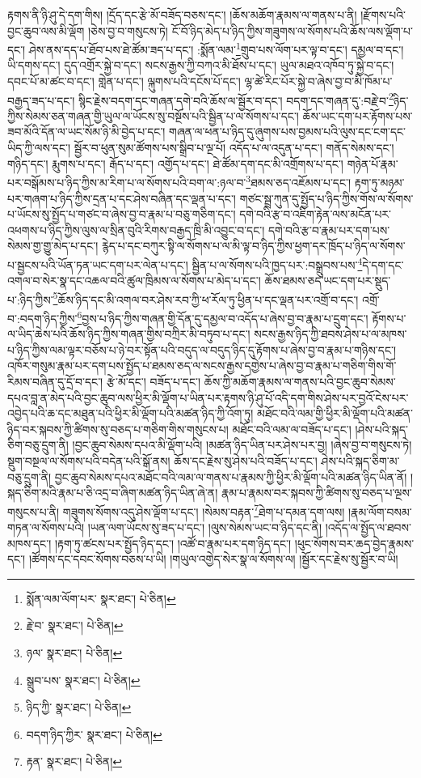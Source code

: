 རྟགས་ནི་ཉི་ཤུ་དེ་དག་གིས། །དྲོད་དང་རྩེ་མོ་བཟོད་བཅས་དང་། །ཆོས་མཆོག་རྣམས་ལ་གནས་པ་ནི། །རྫོགས་པའི་བྱང་ཆུབ་ལས་མི་ལྡོག །ཅེས་བྱ་བ་གསུངས་ཏེ། ངོ་བོ་ཉིད་མེད་པ་ཉིད་ཀྱིས་གཟུགས་ལ་སོགས་པའི་ཆོས་ལས་ལྡོག་པ་དང་། ཤེས་ནས་དད་པ་ཐོབ་པས་ཐེ་ཚོམ་ཟད་པ་དང་། :སྨོན་ལམ་\footnote{སྨོན་ལམ་ལོག་པར་  སྣར་ཐང་།  པེ་ཅིན། }གྲུབ་པས་ལོག་པར་ལྟ་བ་དང་། དམྱལ་བ་དང་། ཡི་དགས་དང་། དུད་འགྲོར་སྐྱེ་བ་དང་། སངས་རྒྱས་ཀྱི་བཀའ་མི་ཐོས་པ་དང་། ཡུལ་མཐའ་འཁོབ་ཏུ་སྐྱེ་བ་དང་། དབང་པོ་མ་ཚང་བ་དང་། གླེན་པ་དང་། ལྐུགས་པའི་དངོས་པོ་དང་། ལྷ་ཚེ་རིང་པོར་སྐྱེ་བ་ཞེས་བྱ་བ་མི་ཁོམ་པ་བརྒྱད་ཟད་པ་དང་། སྙིང་རྗེས་བདག་དང་གཞན་དགེ་བའི་ཆོས་ལ་སྦྱོར་བ་དང་། བདག་དང་གཞན་དུ་:བརྗེ་བ་\footnote{རྗེ་བ་  སྣར་ཐང་།  པེ་ཅིན། }ཉིད་ཀྱིས་སེམས་ཅན་གཞན་གྱི་ཡུལ་ལ་ཡོངས་སུ་བསྔོས་པའི་སྦྱིན་པ་ལ་སོགས་པ་དང་། ཆོས་ཡང་དག་པར་རྟོགས་པས་ཟབ་མོའི་དོན་ལ་ཡང་སོམ་ཉི་མི་བྱེད་པ་དང་། གཞན་ལ་ཕན་པ་ཉིད་དུ་ཞུགས་པས་བྱམས་པའི་ལུས་དང་ངག་དང་ཡིད་ཀྱི་ལས་དང་། སྦྱོར་བ་ཕུན་སུམ་ཚོགས་པས་སྒྲིབ་པ་ལྔ་པོ། འདོད་པ་ལ་འདུན་པ་དང་། གནོད་སེམས་དང་། གཉིད་དང་། རྨུགས་པ་དང་། རྒོད་པ་དང་། འགྱོད་པ་དང་། ཐེ་ཚོམ་དག་དང་མི་འགྲོགས་པ་དང་། གཉེན་པོ་རྣམ་པར་བསྒོམས་པ་ཉིད་ཀྱིས་མ་རིག་པ་ལ་སོགས་པའི་བག་ལ་:ཉལ་བ་\footnote{ཉལ་  སྣར་ཐང་།  པེ་ཅིན། }ཐམས་ཅད་འཇོམས་པ་དང་། རྟག་ཏུ་མཉམ་པར་གཞག་པ་ཉིད་ཀྱིས་དྲན་པ་དང་ཤེས་བཞིན་དང་ལྡན་པ་དང་། གཙང་སྦྲ་ཀུན་དུ་སྤྱོད་པ་ཉིད་ཀྱིས་གོས་ལ་སོགས་པ་ཡོངས་སུ་སྤྱོད་པ་གཙང་བ་ཞེས་བྱ་བ་རྣམ་པ་བཅུ་གཅིག་དང་། དགེ་བའི་རྩ་བ་འཇིག་རྟེན་ལས་མངོན་པར་འཕགས་པ་ཉིད་ཀྱིས་ལུས་ལ་སྲིན་བུའི་རིགས་བརྒྱད་ཁྲི་མི་འབྱུང་བ་དང་། དགེ་བའི་རྩ་བ་རྣམ་པར་དག་པས་སེམས་གྱ་གྱུ་མེད་པ་དང་། རྙེད་པ་དང་བཀུར་སྟི་ལ་སོགས་པ་ལ་མི་ལྟ་བ་ཉིད་ཀྱིས་ཕྱག་དར་ཁྲོད་པ་ཉིད་ལ་སོགས་པ་སྦྱངས་པའི་ཡོན་ཏན་ཡང་དག་པར་ལེན་པ་དང་། སྦྱིན་པ་ལ་སོགས་པའི་ཁྱད་པར་:བསྒྲུབས་པས་\footnote{སྒྲུབ་པས་  སྣར་ཐང་།  པེ་ཅིན། }དེ་དག་དང་འགལ་བ་སེར་སྣ་དང་འཆལ་བའི་ཚུལ་ཁྲིམས་ལ་སོགས་པ་མེད་པ་དང་། ཆོས་ཐམས་ཅད་ཡང་དག་པར་སྡུད་པ་:ཉིད་ཀྱིས་\footnote{ཉིད་ཀྱི་  སྣར་ཐང་།  པེ་ཅིན། }ཆོས་ཉིད་དང་མི་འགལ་བར་ཤེས་རབ་ཀྱི་ཕ་རོལ་ཏུ་ཕྱིན་པ་དང་ལྡན་པར་འགྲོ་བ་དང་། འགྲོ་བ་:བདག་ཉིད་ཀྱིས་\footnote{བདག་ཉིད་ཀྱིར་  སྣར་ཐང་།  པེ་ཅིན། }བྱས་པ་ཉིད་ཀྱིས་གཞན་གྱི་དོན་དུ་དམྱལ་བ་འདོད་པ་ཞེས་བྱ་བ་རྣམ་པ་དྲུག་དང་། རྟོགས་པ་ལ་ཡིད་ཆེས་པའི་ཆོས་ཉིད་ཀྱིས་གཞན་གྱིས་བཀྲིར་མི་བཏུབ་པ་དང་། སངས་རྒྱས་ཉིད་ཀྱི་ཐབས་ཤེས་པ་ལ་མཁས་པ་ཉིད་ཀྱིས་ལམ་ལྟར་བཅོས་པ་ཉེ་བར་སྟོན་པའི་བདུད་ལ་བདུད་ཉིད་དུ་རྟོགས་པ་ཞེས་བྱ་བ་རྣམ་པ་གཉིས་དང་། འཁོར་གསུམ་རྣམ་པར་དག་པས་སྤྱོད་པ་ཐམས་ཅད་ལ་སངས་རྒྱས་དགྱེས་པ་ཞེས་བྱ་བ་རྣམ་པ་གཅིག་གིས་གོ་རིམས་བཞིན་དུ་དྲོ་བ་དང་། རྩེ་མོ་དང་། བཟོད་པ་དང་། ཆོས་ཀྱི་མཆོག་རྣམས་ལ་གནས་པའི་བྱང་ཆུབ་སེམས་དཔའ་བླ་ན་མེད་པའི་བྱང་ཆུབ་ལས་ཕྱིར་མི་ལྡོག་པ་ཡིན་པར་རྟགས་ཉི་ཤུ་པོ་འདི་དག་གིས་ཤེས་པར་བྱའོ་ངེས་པར་འབྱེད་པའི་ཆ་དང་མཐུན་པའི་ཕྱིར་མི་ལྡོག་པའི་མཚན་ཉིད་ཀྱི་འོག་ཏུ། མཐོང་བའི་ལམ་གྱི་ཕྱིར་མི་ལྡོག་པའི་མཚན་ཉིད་བར་སྐབས་ཀྱི་ཚིགས་སུ་བཅད་པ་གཅིག་གིས་གསུངས་པ། མཐོང་བའི་ལམ་ལ་བཟོད་པ་དང་། །ཤེས་པའི་སྐད་ཅིག་བཅུ་དྲུག་ནི། །བྱང་ཆུབ་སེམས་དཔའ་མི་ལྡོག་པའི། །མཚན་ཉིད་ཡིན་པར་ཤེས་པར་བྱ། །ཞེས་བྱ་བ་གསུངས་ཏེ། སྡུག་བསྔལ་ལ་སོགས་པའི་བདེན་པའི་སྒོ་ནས། ཆོས་དང་རྗེས་སུ་ཤེས་པའི་བཟོད་པ་དང་། ཤེས་པའི་སྐད་ཅིག་མ་བཅུ་དྲུག་ནི། བྱང་ཆུབ་སེམས་དཔའ་མཐོང་བའི་ལམ་ལ་གནས་པ་རྣམས་ཀྱི་ཕྱིར་མི་ལྡོག་པའི་མཚན་ཉིད་ཡིན་ནོ། །སྐད་ཅིག་མའི་རྣམ་པ་ཅི་འདྲ་བ་ཞིག་མཚན་ཉིད་ཡིན་ཞེ་ན། རྣམ་པ་རྣམས་བར་སྐབས་ཀྱི་ཚིགས་སུ་བཅད་པ་ལྔས་གསུངས་པ་ནི། གཟུགས་སོགས་འདུ་ཤེས་ལྡོག་པ་དང་། །སེམས་བརྟན་\footnote{རྟན་  སྣར་ཐང་།  པེ་ཅིན། }ཐེག་པ་དམན་དག་ལས། །རྣམ་ལོག་བསམ་གཏན་ལ་སོགས་པའི། །ཡན་ལག་ཡོངས་སུ་ཟད་པ་དང་། །ལུས་སེམས་ཡང་བ་ཉིད་དང་ནི། །འདོད་ལ་སྤྱོད་ལ་ཐབས་མཁས་དང་། །རྟག་ཏུ་ཚངས་པར་སྤྱོད་ཉིད་དང་། །འཚོ་བ་རྣམ་པར་དག་ཉིད་དང་། །ཕུང་སོགས་བར་ཆད་བྱེད་རྣམས་དང་། །ཚོགས་དང་དབང་སོགས་བཅས་པ་ཡི། །གཡུལ་འགྱེད་སེར་སྣ་ལ་སོགས་ལ། །སྦྱོར་དང་རྗེས་སུ་སྦྱོར་བ་ཡི། 